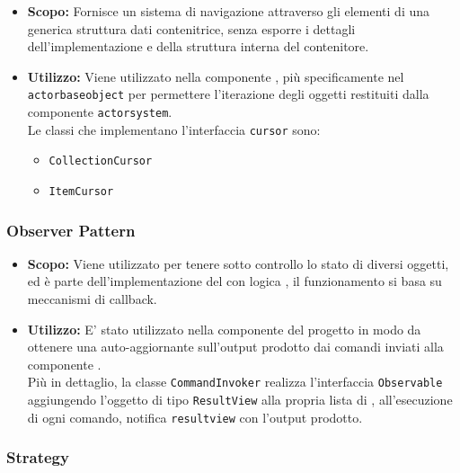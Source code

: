 \documentclass{scalatekids-article}
\begin{document}
\begin{itemize}
\item \textbf{Scopo:} Fornisce un sistema di navigazione attraverso gli elementi di una generica struttura dati contenitrice,
  senza esporre i dettagli dell'implementazione e della struttura interna del contenitore.
\item \textbf{Utilizzo:} Viene utilizzato nella componente , più specificamente nel  \verb=actorbaseobject=
  per permettere l'iterazione degli oggetti restituiti dalla componente \verb=actorsystem=.\\
  Le classi che implementano l'interfaccia \verb=cursor= sono:
  \begin{itemize}
  \item \verb=CollectionCursor=
  \item \verb=ItemCursor=
  \end{itemize}
\end{itemize}

\subsubsection{Observer Pattern}

\label{sec:ObserverPattern}

\begin{itemize}
\item \textbf{Scopo:} Viene utilizzato per tenere sotto controllo lo stato di diversi oggetti, ed è parte dell'implementazione
  del   con logica , il funzionamento si basa su meccanismi di callback.
\item \textbf{Utilizzo:} E' stato utilizzato nella componente  del progetto in modo da ottenere una 
  auto-aggiornante sull'output prodotto dai comandi inviati alla componente .\\
  Più in dettaglio, la classe \verb=CommandInvoker= realizza l'interfaccia \verb=Observable= aggiungendo l'oggetto di tipo
  \verb=ResultView= alla propria lista di , all'esecuzione di ogni comando, notifica \verb=resultview=
  con l'output prodotto.
\end{itemize}

\subsubsection{Strategy}
\end{document}
